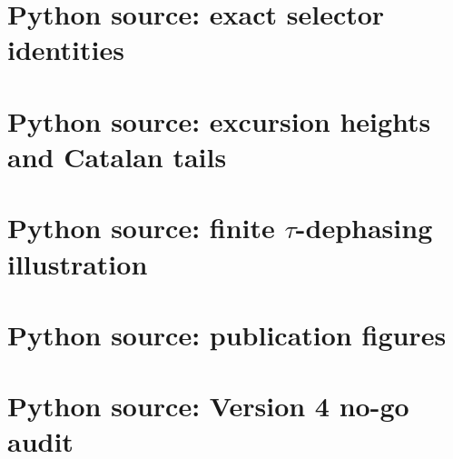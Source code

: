 \documentclass[11pt]{amsart}
\numberwithin{equation}{section}
\theoremstyle{plain}
\theoremstyle{definition}
\theoremstyle{remark}
\begin{document}
\section{Python source: exact selector identities}


\section{Python source: excursion heights and Catalan tails}


\section{Python source: finite $\tau$-dephasing illustration}


\section{Python source: publication figures}


\section{Python source: Version 4 no-go audit}

\end{document}
